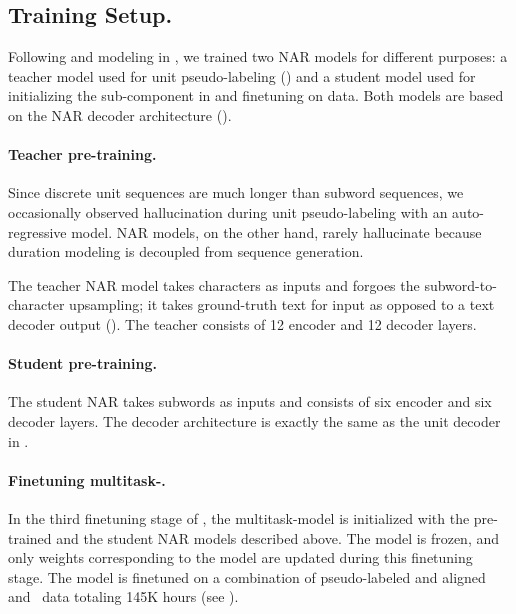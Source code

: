 

\subsection{\sst Training Setup.}\label{sec:offline:s2st}

Following \sst and \tu modeling in \mfourt, we trained two NAR \tu models for different purposes:
a teacher \tu model used for unit pseudo-labeling ()
and a student \tu model used for initializing the \tu sub-component in \unitytwo and finetuning on \sst data.
Both \tu models are based on the NAR decoder architecture ().

\paragraph{Teacher \tu pre-training.}
Since discrete unit sequences are much longer than subword sequences, we occasionally observed hallucination during unit pseudo-labeling with an auto-regressive model.
NAR models, on the other hand, rarely hallucinate because duration modeling is decoupled from sequence generation.

The \mfourttwo teacher NAR \tu model takes characters as inputs and forgoes the subword-to-character upsampling; it takes ground-truth text for input as opposed to a text decoder output ().
The teacher \tu consists of 12 encoder and 12 decoder layers.

\paragraph{Student \tu pre-training.}
The student NAR {\tu} takes subwords as inputs and consists of six encoder and six decoder layers.
The decoder architecture is exactly the same as the unit decoder in {\unitytwo}.


\paragraph{Finetuning multitask-\unitytwo.}
In the third finetuning stage of \mfourttwo, the multitask-\unitytwo model is initialized with the pre-trained \xt and the student NAR \tu models described above. The \xt model is frozen, and only weights corresponding to the \tu model are updated during this finetuning stage. The model is finetuned on a combination of pseudo-labeled and aligned \xeng and \engx \ \sst data totaling 
145K hours (see ). 

